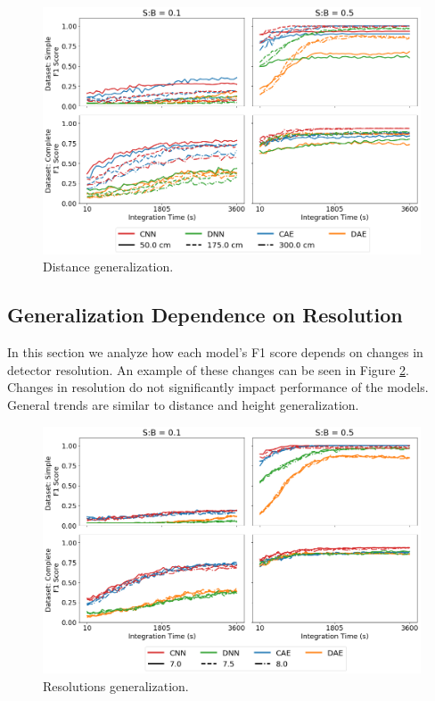 \begin{figure}[H]
	\centering
	\includegraphics[width=1.0\linewidth]{images/sim-generalization-dist}
	\caption{Distance generalization.}
	\label{fig:sim-generalization-dist}
\end{figure}



\subsection{Generalization Dependence on Resolution}

In this section we analyze how each model's F1 score depends on changes in detector resolution. An example of these changes can be seen in Figure \ref{fig:sim-generalization-fwhm}. Changes in resolution do not significantly impact performance of the models. General trends are similar to distance and height generalization. 

\begin{figure}[H]
	\centering
	\includegraphics[width=1.0\linewidth]{images/sim-generalization-fwhm}
	\caption{Resolutions generalization.}
	\label{fig:sim-generalization-fwhm}
\end{figure}


